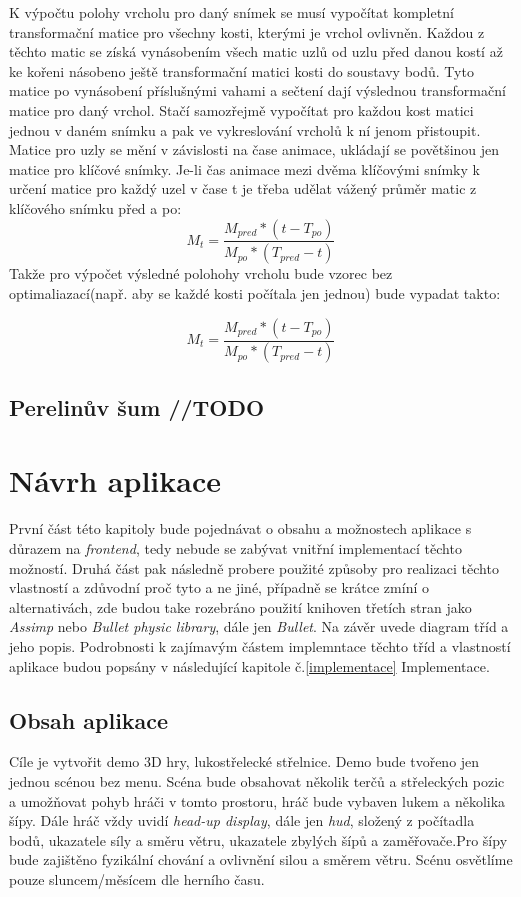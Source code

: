K výpočtu polohy vrcholu pro daný snímek se musí vypočítat kompletní transformační matice pro všechny kosti, kterými je vrchol ovlivněn. Každou z těchto matic se získá vynásobením všech matic uzlů od uzlu před danou kostí až ke kořeni násobeno ještě transformační matici kosti do soustavy bodů. Tyto matice po vynásobení příslušnými vahami a sečtení dají výslednou transformační matice pro daný vrchol. Stačí samozřejmě vypočítat pro každou kost matici jednou v daném snímku a pak ve vykreslování vrcholů k ní jenom přistoupit. Matice pro uzly se mění v závislosti na čase animace, ukládají se povětšinou jen matice pro klíčové snímky. Je-li čas animace mezi dvěma klíčovými snímky k určení matice pro každý uzel v čase t je třeba udělat vážený průměr matic z klíčového snímku před a po:
\begin{equation}\label{SAprumer}
M_t = \frac{M_{pred} * (t - T_{po})}{M_{po} *(T_{pred} - t)}
\end{equation}
Takže pro výpočet výsledné polohohy vrcholu bude vzorec bez optimaliazací(např. aby se každé kosti počítala jen jednou) bude vypadat takto:

\begin{equation}\label{SAvzorec}
M_t = \frac{M_{pred} * (t - T_{po})}{M_{po} *(T_{pred} - t)}
\end{equation}
  
\section{Perelinův šum //TODO}
\chapter{Návrh aplikace\label{Navrh_aplikace}}
První část této kapitoly bude pojednávat o obsahu a možnostech aplikace s důrazem na \emph{frontend}, tedy nebude se zabývat vnitřní implementací těchto možností. Druhá část pak následně probere použité způsoby pro realizaci těchto vlastností a zdůvodní proč tyto a ne jiné, případně se krátce zmíní o alternativách, zde budou take rozebráno použití knihoven třetích stran jako \emph{Assimp}\cite{assimp} nebo \emph{Bullet physic library}\cite{bullet}, dále jen \emph{Bullet}. Na závěr uvede diagram tříd a jeho popis. Podrobnosti k zajímavým částem implemntace těchto tříd a vlastností aplikace budou popsány v následující kapitole č.\ref{implementace} Implementace. 
\section{Obsah aplikace}
Cíle je vytvořit demo 3D hry, lukostřelecké střelnice. Demo bude tvořeno jen jednou scénou bez menu. Scéna bude obsahovat několik terčů a střeleckých pozic a umožňovat pohyb hráči v tomto prostoru, hráč bude vybaven  lukem a několika šípy. Dále hráč vždy uvidí \emph{head-up display}, dále jen \emph{hud}, složený z počítadla bodů, ukazatele síly a směru větru, ukazatele zbylých šípů a zaměřovače.Pro šípy bude zajištěno fyzikální chování a ovlivnění silou a směrem větru. Scénu osvětlíme pouze sluncem/měsícem dle herního času.
